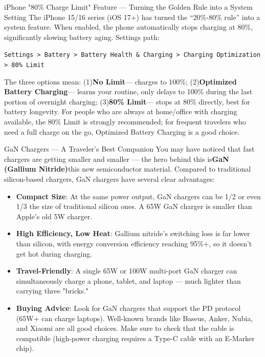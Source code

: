 \begin{tcbinfo}{iPhone "80\% Charge Limit" Feature — Turning the Golden Rule into a System Setting}
The iPhone 15/16 series (iOS 17+) has turned the “20\%-80\% rule” into a system feature. When enabled, the phone automatically stops charging at 80\%, significantly slowing battery aging. Settings path:

\texttt{Settings > Battery > Battery Health \& Charging > Charging Optimization > 80\% Limit}

The three options mean: (1)\textbf{No Limit}— charges to 100\%; (2)\textbf{Optimized Battery Charging}— learns your routine, only delays to 100\% during the last portion of overnight charging; (3)\textbf{80\% Limit}— stops at 80\% directly, best for battery longevity. For people who are always at home/office with charging available, the 80\% Limit is strongly recommended; for frequent travelers who need a full charge on the go, Optimized Battery Charging is a good choice.

\end{tcbinfo}

\begin{tcbinfo}{GaN Chargers — A Traveler's Best Companion}
You may have noticed that fast chargers are getting smaller and smaller — the hero behind this is\textbf{GaN (Gallium Nitride)}this new semiconductor material. Compared to traditional silicon-based chargers, GaN chargers have several clear advantages:

\begin{itemize}
  \item \textbf{Compact Size}: At the same power output, GaN chargers can be 1/2 or even 1/3 the size of traditional silicon ones. A 65W GaN charger is smaller than Apple's old 5W charger.
  \item \textbf{High Efficiency, Low Heat}: Gallium nitride's switching loss is far lower than silicon, with energy conversion efficiency reaching 95\%+, so it doesn't get hot during charging.
  \item \textbf{Travel-Friendly}: A single 65W or 100W multi-port GaN charger can simultaneously charge a phone, tablet, and laptop — much lighter than carrying three "bricks."
  \item \textbf{Buying Advice}: Look for GaN chargers that support the PD protocol (65W+ can charge laptops). Well-known brands like Baseus, Anker, Nubia, and Xiaomi are all good choices. Make sure to check that the cable is compatible (high-power charging requires a Type-C cable with an E-Marker chip).
\end{itemize}

\end{tcbinfo}

